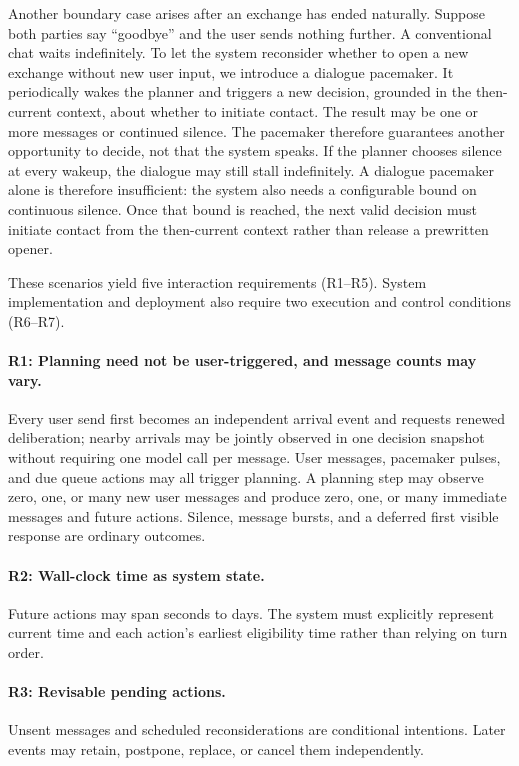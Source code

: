 \documentclass[manuscript,nonacm]{acmart}
\begin{document}
Another boundary case arises after an exchange has ended naturally. Suppose both
parties say ``goodbye'' and the user sends nothing further. A conventional chat
waits indefinitely. To let the system reconsider whether to open a new exchange
without new user input, we introduce a dialogue pacemaker. It periodically
wakes the planner and triggers a new decision, grounded in the then-current
context, about whether to initiate contact. The result may be one or more messages
or continued silence. The pacemaker therefore guarantees another opportunity to
decide, not that the system speaks. If the planner chooses silence at every
wakeup, the dialogue may still stall indefinitely. A dialogue pacemaker alone is
therefore insufficient: the system also needs a configurable bound on continuous
silence. Once that bound is reached, the next valid decision must initiate contact
from the then-current context rather than release a prewritten opener.

These scenarios yield five interaction requirements (R1--R5). System
implementation and deployment also require two execution and control conditions
(R6--R7).

\paragraph{R1: Planning need not be user-triggered, and message counts may vary.}
Every user send first becomes an independent arrival event and requests renewed
deliberation; nearby arrivals may be jointly observed in one decision snapshot
without requiring one model call per message. User messages, pacemaker pulses,
and due queue actions may all trigger planning. A planning step may observe zero,
one, or many new user messages and produce zero, one, or many immediate messages
and future actions. Silence, message bursts, and a deferred first visible
response are ordinary outcomes.

\paragraph{R2: Wall-clock time as system state.}
Future actions may span seconds to days. The system must explicitly represent
current time and each action's earliest eligibility time rather than relying on
turn order.

\paragraph{R3: Revisable pending actions.}
Unsent messages and scheduled reconsiderations are conditional intentions. Later
events may retain, postpone, replace, or cancel them independently.
\end{document}
